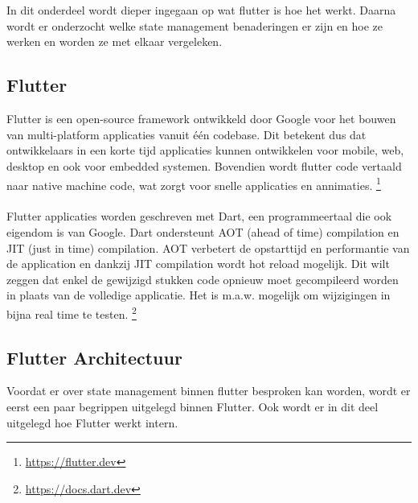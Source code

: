 \chapter{}%
\label{ch:stand-van-zaken}

In dit onderdeel wordt dieper ingegaan op wat flutter is hoe het werkt. Daarna wordt er onderzocht welke state management benaderingen er 
zijn en hoe ze werken en worden ze met elkaar vergeleken.

\section{{Flutter}}%
\label{sec:Flutter}
Flutter is een open-source framework ontwikkeld door Google voor het bouwen van multi-platform applicaties vanuit één codebase. 
Dit betekent dus dat ontwikkelaars in een korte tijd applicaties kunnen ontwikkelen voor mobile, web, desktop en ook voor embedded systemen.
Bovendien wordt flutter code vertaald naar native machine code, wat zorgt voor snelle applicaties en annimaties. \footnote{\url{https://flutter.dev}}
\\
\\
Flutter applicaties worden geschreven met Dart, een programmeertaal die ook eigendom is van Google. Dart ondersteunt AOT (ahead of time) 
compilation en JIT (just in time) compilation. AOT verbetert de opstarttijd en performantie van de application en dankzij JIT compilation 
wordt hot reload mogelijk. Dit wilt zeggen dat enkel de gewijzigd stukken code opnieuw moet gecompileerd worden in plaats van de volledige applicatie.
Het is m.a.w. mogelijk om wijzigingen in bijna real time te testen. \footnote{\url{https://docs.dart.dev}}

\section{Flutter Architectuur}
\label{sec:Flutter Architectuur}
Voordat er over state management binnen flutter besproken kan worden, wordt er eerst een paar begrippen uitgelegd binnen Flutter. Ook wordt er in dit deel uitgelegd hoe Flutter werkt intern.

